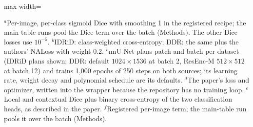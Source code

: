 \begin{table}[t]
\begin{adjustbox}{max width=\textwidth}
\begin{threeparttable}
\begin{tablenotes}[flushleft]
\item $^a$Per-image, per-class sigmoid Dice with smoothing 1 in the registered recipe; the main-table runs pool the Dice term over the batch (Methods). The other Dice losses use $10^{-5}$. $^b$IDRiD: class-weighted cross-entropy; DDR: the same plus the authors' NALoss with weight 0.2. $^c$nnU-Net plans patch and batch per dataset (IDRiD plans shown; DDR: default $1024\times1536$ at batch 2, ResEnc-M $512\times512$ at batch 12) and trains 1,000 epochs of 250 steps on both sources; its learning rate, weight decay and polynomial schedule are its defaults. $^d$The paper's loss and optimizer, written into the wrapper because the repository has no training loop. $^e$Local and contextual Dice plus binary cross-entropy of the two classification heads, as described in the paper. $^f$Registered per-image term; the main-table run pools it over the batch (Methods).
\end{tablenotes}
\end{threeparttable}
\end{adjustbox}
\end{table}

